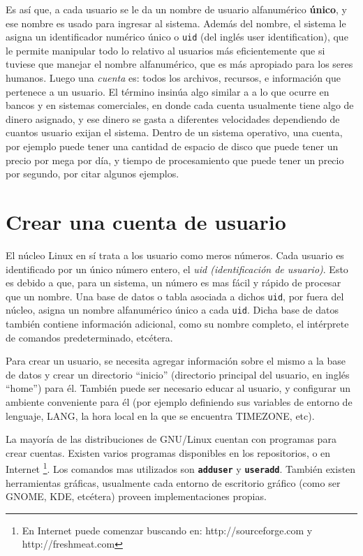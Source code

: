 \documentclass[12pt]{article}
\begin{document}
Es así que, a cada usuario se le da un nombre de usuario alfanumérico  
\textbf{único}, y ese nombre es usado para ingresar al sistema. 
Además del nombre, el sistema le asigna un identificador numérico único o 
\texttt{uid} (del inglés user identification), que le permite manipular todo 
lo relativo al usuarios más eficientemente que si tuviese que manejar el 
nombre alfanumérico, que es más apropiado para los seres humanos.   
Luego una \textit{cuenta} es: todos los archivos, recursos, e información 
que pertenece a un usuario. El término insinúa algo similar a 
a lo que ocurre en bancos y en sistemas comerciales, en donde cada cuenta 
usualmente tiene algo de dinero asignado, y ese dinero se gasta a 
diferentes velocidades dependiendo de cuantos usuario exijan el sistema.
Dentro de un sistema operativo, una cuenta, por ejemplo  puede tener una 
cantidad de espacio de disco que puede tener un precio por mega por día, y
tiempo de procesamiento que puede tener un precio por segundo, por citar algunos
ejemplos. 

\section*{Crear una cuenta de usuario}
El núcleo Linux en sí trata a los usuario como meros números. Cada
usuario es identificado por un único número entero, el \textit{uid
(identificación de usuario)}. Esto es debido a que, para un sistema, un número es mas fácil
y rápido de procesar que un nombre. Una base de datos o tabla
asociada a dichos \texttt{uid}, por fuera del núcleo, asigna un nombre alfanumérico 
único a cada \texttt{uid}. Dicha base de datos también contiene información adicional, 
como su nombre completo, el intérprete de comandos predeterminado, etcétera. 

Para crear un usuario, se necesita agregar información sobre el mismo a la
base de datos y crear un directorio ``inicio'' (directorio principal
del usuario, en inglés ``home'') para él. También puede ser necesario educar al 
usuario, y configurar un ambiente conveniente para él (por ejemplo definiendo sus
variables de entorno de lenguaje, LANG, la hora local en la que se encuentra
TIMEZONE, etc).

La mayoría de las distribuciones de GNU/Linux cuentan con programas para crear
cuentas. Existen varios programas disponibles en los repositorios,
o en Internet \footnote{En Internet puede comenzar buscando en:
http://sourceforge.com y http://freshmeat.com}.  
Los comandos mas utilizados son \texttt{\textbf{adduser}} y
\texttt{\textbf{useradd}}. También existen herramientas gráficas, usualmente 
cada entorno de escritorio gráfico (como ser GNOME, KDE, etcétera) proveen  
implementaciones propias. 
\end{document}

